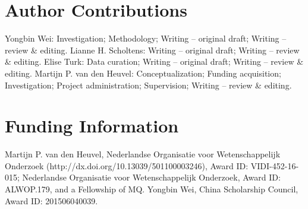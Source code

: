 \begin{refsection}
\section*{Author Contributions}
Yongbin Wei: Investigation; Methodology; Writing – original draft; Writing – review \& editing. Lianne H. Scholtens: Writing – original draft; Writing – review \& editing. Elise Turk: Data curation; Writing – original draft; Writing – review \& editing. Martijn P. van den Heuvel: Conceptualization; Funding acquisition; Investigation; Project administration; Supervision; Writing – review \& editing.

\section*{Funding Information}
Martijn P. van den Heuvel, Nederlandse Organisatie voor Wetenschappelijk Onderzoek (http://dx.doi.org/10.13039/501100003246), Award ID: VIDI-452-16-015; Nederlandse Organisatie voor Wetenschappelijk Onderzoek, Award ID: ALWOP.179, and a Fellowship of MQ. Yongbin Wei, China Scholarship Council, Award ID: 201506040039.

\printbibliography[heading=subbibliography]

\end{refsection}

